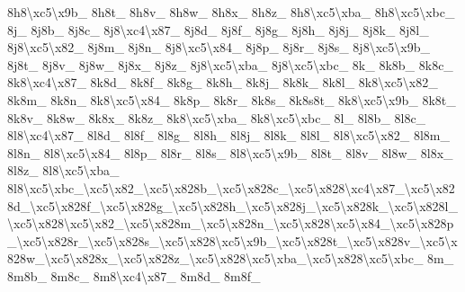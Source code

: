 \begin{DoxyCompactItemize}
8h8\textbackslash{}xc5\textbackslash{}x9b\-\_\- 8h8t\-\_\- 8h8v\-\_\- 8h8w\-\_\- 8h8x\-\_\- 8h8z\-\_\- 8h8\textbackslash{}xc5\textbackslash{}xba\-\_\- 8h8\textbackslash{}xc5\textbackslash{}xbc\-\_\- 8j\-\_\- 8j8b\-\_\- 8j8c\-\_\- 8j8\textbackslash{}xc4\textbackslash{}x87\-\_\- 8j8d\-\_\- 8j8f\-\_\- 8j8g\-\_\- 8j8h\-\_\- 8j8j\-\_\- 8j8k\-\_\- 8j8l\-\_\- 8j8\textbackslash{}xc5\textbackslash{}x82\-\_\- 8j8m\-\_\- 8j8n\-\_\- 8j8\textbackslash{}xc5\textbackslash{}x84\-\_\- 8j8p\-\_\- 8j8r\-\_\- 8j8s\-\_\- 8j8\textbackslash{}xc5\textbackslash{}x9b\-\_\- 8j8t\-\_\- 8j8v\-\_\- 8j8w\-\_\- 8j8x\-\_\- 8j8z\-\_\- 8j8\textbackslash{}xc5\textbackslash{}xba\-\_\- 8j8\textbackslash{}xc5\textbackslash{}xbc\-\_\- 8k\-\_\- 8k8b\-\_\- 8k8c\-\_\- 8k8\textbackslash{}xc4\textbackslash{}x87\-\_\- 8k8d\-\_\- 8k8f\-\_\- 8k8g\-\_\- 8k8h\-\_\- 8k8j\-\_\- 8k8k\-\_\- 8k8l\-\_\- 8k8\textbackslash{}xc5\textbackslash{}x82\-\_\- 8k8m\-\_\- 8k8n\-\_\- 8k8\textbackslash{}xc5\textbackslash{}x84\-\_\- 8k8p\-\_\- 8k8r\-\_\- 8k8s\-\_\- 8k8s8t\-\_\- 8k8\textbackslash{}xc5\textbackslash{}x9b\-\_\- 8k8t\-\_\- 8k8v\-\_\- 8k8w\-\_\- 8k8x\-\_\- 8k8z\-\_\- 8k8\textbackslash{}xc5\textbackslash{}xba\-\_\- 8k8\textbackslash{}xc5\textbackslash{}xbc\-\_\- 8l\-\_\- 8l8b\-\_\- 8l8c\-\_\- 8l8\textbackslash{}xc4\textbackslash{}x87\-\_\- 8l8d\-\_\- 8l8f\-\_\- 8l8g\-\_\- 8l8h\-\_\- 8l8j\-\_\- 8l8k\-\_\- 8l8l\-\_\- 8l8\textbackslash{}xc5\textbackslash{}x82\-\_\- 8l8m\-\_\- 8l8n\-\_\- 8l8\textbackslash{}xc5\textbackslash{}x84\-\_\- 8l8p\-\_\- 8l8r\-\_\- 8l8s\-\_\- 8l8\textbackslash{}xc5\textbackslash{}x9b\-\_\- 8l8t\-\_\- 8l8v\-\_\- 8l8w\-\_\- 8l8x\-\_\- 8l8z\-\_\- 8l8\textbackslash{}xc5\textbackslash{}xba\-\_\- 8l8\textbackslash{}xc5\textbackslash{}xbc\-\_\textbackslash{}xc5\textbackslash{}x82\-\_\textbackslash{}xc5\textbackslash{}x828b\-\_\textbackslash{}xc5\textbackslash{}x828c\-\_\textbackslash{}xc5\textbackslash{}x828\textbackslash{}xc4\textbackslash{}x87\-\_\textbackslash{}xc5\textbackslash{}x828d\-\_\textbackslash{}xc5\textbackslash{}x828f\-\_\textbackslash{}xc5\textbackslash{}x828g\-\_\textbackslash{}xc5\textbackslash{}x828h\-\_\textbackslash{}xc5\textbackslash{}x828j\-\_\textbackslash{}xc5\textbackslash{}x828k\-\_\textbackslash{}xc5\textbackslash{}x828l\-\_\textbackslash{}xc5\textbackslash{}x828\textbackslash{}xc5\textbackslash{}x82\-\_\textbackslash{}xc5\textbackslash{}x828m\-\_\textbackslash{}xc5\textbackslash{}x828n\-\_\textbackslash{}xc5\textbackslash{}x828\textbackslash{}xc5\textbackslash{}x84\-\_\textbackslash{}xc5\textbackslash{}x828p\-\_\textbackslash{}xc5\textbackslash{}x828r\-\_\textbackslash{}xc5\textbackslash{}x828s\-\_\textbackslash{}xc5\textbackslash{}x828\textbackslash{}xc5\textbackslash{}x9b\-\_\textbackslash{}xc5\textbackslash{}x828t\-\_\textbackslash{}xc5\textbackslash{}x828v\-\_\textbackslash{}xc5\textbackslash{}x828w\-\_\textbackslash{}xc5\textbackslash{}x828x\-\_\textbackslash{}xc5\textbackslash{}x828z\-\_\textbackslash{}xc5\textbackslash{}x828\textbackslash{}xc5\textbackslash{}xba\-\_\textbackslash{}xc5\textbackslash{}x828\textbackslash{}xc5\textbackslash{}xbc\-\_\- 8m\-\_\- 8m8b\-\_\- 8m8c\-\_\- 8m8\textbackslash{}xc4\textbackslash{}x87\-\_\- 8m8d\-\_\- 8m8f\-\_\- 
\end{DoxyCompactItemize}
